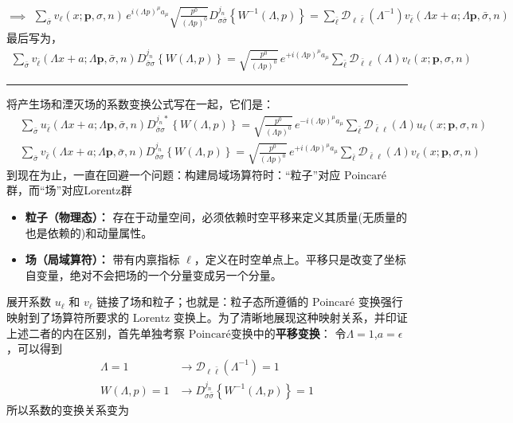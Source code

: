 \[\implies
    \begin{aligned}
            \sum_{\bar{\sigma}}v_{\ell}(x;\boldsymbol{p},\sigma,n)\,e^{i(\Lambda p)^\mu a_\mu}\sqrt{\frac{p^0}{(\Lambda p)^0}}D_{\sigma \bar{\sigma}}^{j_n}\left\{W^{-1}(\Lambda,p)\right\}=\sum_{\bar{\ell}}\mathscr{D}_{\ell\bar{\ell}}(\Lambda^{-1})v_{\bar{\ell}}(\Lambda x+a;\Lambda \boldsymbol{p},\bar{\sigma},n)
    \end{aligned}\]
最后写为，
\begin{equation}
    \begin{aligned}
            \sum_{\bar{\sigma}}v_{\bar{\ell}}(\Lambda x+a;\Lambda \boldsymbol{p},\bar{\sigma},n)D_{\bar{\sigma}\sigma }^{j_n}\left\{W(\Lambda,p)\right\}=\sqrt{\frac{p^0}{(\Lambda p)^0}}\,e^{+i(\Lambda p)^\mu a_\mu}\sum_{\bar{\ell}}\mathscr{D}_{\bar{\ell}\ell}(\Lambda)v_{\ell}(x;\boldsymbol{p},\sigma,n)
    \end{aligned}
\end{equation}
\hrule
\vspace{2ex}
将产生场和湮灭场的系数变换公式写在一起，它们是：
\begin{subequations}
    \begin{align}
        &\sum_{\bar{\sigma}}u_{\bar{\ell}}(\Lambda x+a;\Lambda \boldsymbol{p},\bar{\sigma},n)D_{\bar{\sigma}\sigma }^{j_n*}\left\{W(\Lambda,p)\right\}=\sqrt{\frac{p^0}{(\Lambda p)^0}}\,e^{-i(\Lambda p)^\mu a_\mu}\sum_{\bar{\ell}}\mathscr{D}_{\bar{\ell}\ell}(\Lambda)u_{\ell}(x;\boldsymbol{p},\sigma,n)
        \\
        &\sum_{\bar{\sigma}}v_{\bar{\ell}}(\Lambda x+a;\Lambda \boldsymbol{p},\bar{\sigma},n)D_{\bar{\sigma}\sigma }^{j_n}\left\{W(\Lambda,p)\right\}=\sqrt{\frac{p^0}{(\Lambda p)^0}}\,e^{+i(\Lambda p)^\mu a_\mu}\sum_{\bar{\ell}}\mathscr{D}_{\bar{\ell}\ell}(\Lambda)v_{\ell}(x;\boldsymbol{p},\sigma,n)
    \end{align}
\end{subequations}
\color{blue}到现在为止，一直在回避一个问题：构建局域场算符时：“粒子”对应 $\text{Poincar\'e}$ 群，而“场”对应Lorentz群
\begin{itemize}
    \item \textbf{粒子（物理态）：} 存在于动量空间，必须依赖时空平移来定义其质量(无质量的也是依赖的)和动量属性。
    \item \textbf{场（局域算符）：} 带有内禀指标 $\ell$，定义在时空单点上。平移只是改变了坐标自变量，绝对不会把场的一个分量变成另一个分量。
\end{itemize}


展开系数 $u_\ell$ 和 $v_\ell$ 链接了场和粒子；也就是：粒子态所遵循的 $\text{Poincar\'e}$ 变换强行映射到了场算符所要求的 Lorentz 变换上。\normalcolor 为了清晰地展现这种映射关系，并印证上述二者的内在区别，首先单独考察 $\text{Poincar\'e}$变换中的\textbf{平移变换}：
令$\Lambda=1$,$a=\epsilon$，可以得到
\[\begin{aligned}
    \Lambda=1&\to \mathscr{D}_{\ell\bar{\ell}}(\Lambda^{-1})=1\\
    W(\Lambda,p)=1&\to D_{\sigma \bar{\sigma}}^{j_n}\!\left\{W^{-1}(\Lambda,p)\right\}=1
\end{aligned}\]
所以系数的变换关系变为


